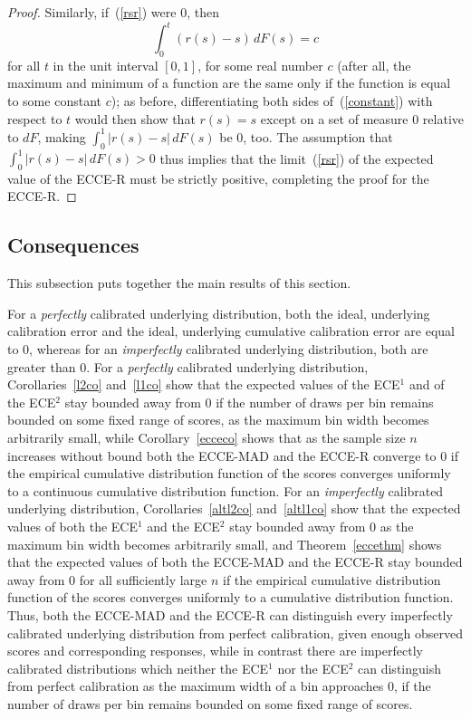 \documentclass{article}
\begin{document}
\begin{proof}
Similarly, if~(\ref{rsr}) were 0, then
%
\begin{equation}
\label{constant}
\int_0^t (r(s) - s) \, dF(s) = c
\end{equation}
%
for all $t$ in the unit interval $[0, 1]$, for some real number $c$
(after all, the maximum and minimum of a function are the same
only if the function is equal to some constant $c$); as before,
differentiating both sides of~(\ref{constant}) with respect to $t$
would then show that $r(s) = s$ except on a set of measure 0 relative to $dF$,
making $\int_0^1 |r(s) - s| \, dF(s)$ be 0, too.
The assumption that $\int_0^1 |r(s) - s| \, dF(s) > 0$ thus implies that
the limit~(\ref{rsr}) of the expected value of the ECCE-R
must be strictly positive, completing the proof for the ECCE-R.
\end{proof}


\subsection{Consequences}
\label{consequences}

This subsection puts together the main results of this section.

For a {\it perfectly} calibrated underlying distribution,
both the ideal, underlying calibration error
and the ideal, underlying cumulative calibration error are equal to 0,
whereas for an {\it imperfectly} calibrated underlying distribution,
both are greater than 0.
For a {\it perfectly} calibrated underlying distribution,
Corollaries~\ref{l2co} and~\ref{l1co} show that the expected values
of the ECE$^1$ and of the ECE$^2$ stay bounded away from 0
if the number of draws per bin remains bounded on some fixed range of scores,
as the maximum bin width becomes arbitrarily small,
while Corollary~\ref{ecceco} shows that as the sample size $n$
increases without bound both the ECCE-MAD and the ECCE-R converge to 0
if the empirical cumulative distribution function of the scores
converges uniformly to a continuous cumulative distribution function.
For an {\it imperfectly} calibrated underlying distribution,
Corollaries~\ref{altl2co} and~\ref{altl1co} show that the expected values
of both the ECE$^1$ and the ECE$^2$ stay bounded away from 0
as the maximum bin width becomes arbitrarily small,
and Theorem~\ref{eccethm} shows that the expected values
of both the ECCE-MAD and the ECCE-R stay bounded away from 0
for all sufficiently large $n$
if the empirical cumulative distribution function of the scores
converges uniformly to a cumulative distribution function.
Thus, both the ECCE-MAD and the ECCE-R can distinguish
every imperfectly calibrated underlying distribution from perfect calibration,
given enough observed scores and corresponding responses,
while in contrast there are imperfectly calibrated distributions which
neither the ECE$^1$ nor the ECE$^2$ can distinguish from perfect calibration
as the maximum width of a bin approaches 0, if the number of draws per bin
remains bounded on some fixed range of scores.
\end{document}
